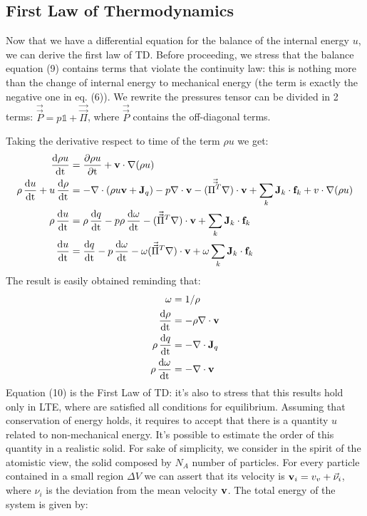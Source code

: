 \documentclass{article}
\newcommand*\diff{\mathop{}\!\mathrm{d}}
\newcommand*\Tder[1]{\mathop{}\!\frac{\diff #1}{\diff \mathrm{t}}}
\newcommand*\tder[1]{\mathop{}\!\frac{\partial #1}{\partial \mathrm{t}} }
\begin{document}
\subsection{First Law of Thermodynamics}
Now that we have a differential equation for the balance of the internal energy $u$, we can derive the first law of TD. Before proceeding, we stress that the balance equation (9) contains terms that violate the continuity law: this is nothing more than the change of internal energy to mechanical energy (the term is exactly the negative one in eq. (6)). We rewrite the pressures tensor can be divided in 2 terms: $\Vec{\Vec{P}} = p \mathbb{1} + \Vec{\Vec{\Pi}} $, where $\Vec{\Vec{P}}$ contains the off-diagonal terms.

Taking the derivative respect to time of the term $\rho u$ we get:
\begin{equation}
       \begin{aligned}
    \Tder{\rho u} &= \tder{\rho u} +\v_v \cdot \nabla (\rho u)  \\
    \rho \Tder{u}+u\Tder{\rho} &= -\nabla \cdot (\rho u \v_v + \mathbf{J}_q ) - p\nabla \cdot \v_v -(\Vec{\Vec{\Pi^T}}\nabla)\cdot \v_v +\sum_k \mathbf{J}_k \cdot\mathbf{f}_k +v\cdot \nabla (\rho u) \\
    \rho \Tder{u} &= \rho \Tder{q} - p\rho \Tder{\omega} -(\Vec{\Vec{\Pi}}^T\nabla)\cdot \v_v +\sum_k \mathbf{J}_k \cdot\mathbf{f}_k \\
    \Tder{u} &=  \Tder{q} - p \Tder{\omega} -\omega(\Vec{\Vec{\Pi}}^T\nabla)\cdot \v_v +\omega\sum_k \mathbf{J}_k \cdot\mathbf{f}_k
    \end{aligned}
\end{equation}
The result is easily obtained reminding that:
\begin{equation*}
    \begin{aligned}
    \omega &= 1/\rho \\
    \Tder{\rho} &= -\rho \nabla \cdot \v_v\\
    \rho \Tder{q}&= -\nabla \cdot \mathbf{J}_q\\
    \rho \Tder{\omega} &= -\nabla\cdot \v_v\\
    \end{aligned}
\end{equation*}
Equation (10) is the First Law of TD: it's also to stress that this results hold only in LTE, where are satisfied all conditions for equilibrium. Assuming that conservation of energy holds, it requires to accept that there is a quantity $u$ related to non-mechanical energy. It's possible to estimate the order of this quantity in a realistic solid. For sake of simplicity, we consider in the spirit of the atomistic view, the solid composed by $N_A$ number of particles. For every particle contained in a small region $\Delta V$ we can assert that its velocity is $\v_v_i =v_v +\Vec{\nu}_i $, where $\nu_i$ is the deviation from the mean velocity $\v_v$. The total energy of the system is given by:
\end{document}
